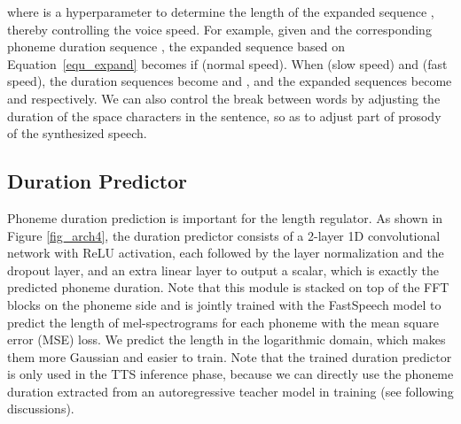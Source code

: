 \documentclass{article}
\begin{document}
where  is a hyperparameter to determine the length of the expanded sequence , thereby controlling the voice speed. For example, given  and the corresponding phoneme duration sequence , the expanded sequence  based on Equation~\ref{equ_expand} becomes  if  (normal speed). When  (slow speed) and  (fast speed), the duration sequences become  and , and the expanded sequences become  and  respectively. We can also control the break between words by adjusting the duration of the space characters in the sentence, so as to adjust part of prosody of the synthesized speech.

\subsection{Duration Predictor}
Phoneme duration prediction is important for the length regulator. As shown in Figure \ref{fig_arch4}, the duration predictor consists of a 2-layer 1D convolutional network with ReLU activation, each followed by the layer normalization and the dropout layer, and an extra linear layer to output a scalar, which is exactly the predicted phoneme duration. Note that this module is stacked on top of the FFT blocks on the phoneme side and is jointly trained with the FastSpeech model to predict the length of mel-spectrograms for each phoneme with the mean square error (MSE) loss. We predict the length in the logarithmic domain, which makes them more Gaussian and easier to train. Note that the trained duration predictor is only used in the TTS inference phase, because we can directly use the phoneme duration extracted from an autoregressive teacher model in training (see following discussions).
\end{document}
